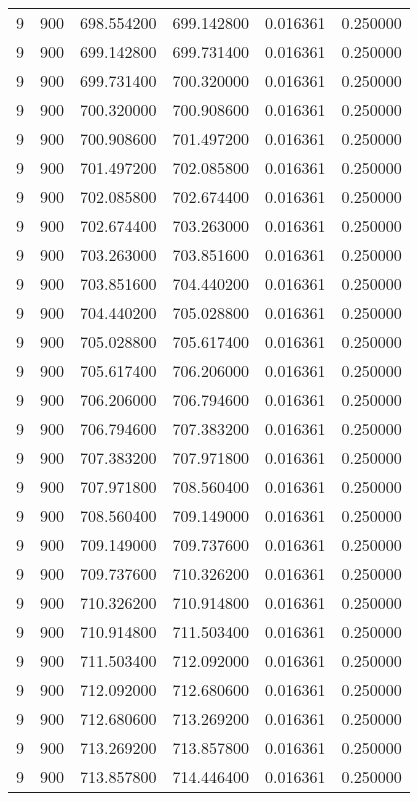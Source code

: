 \begin{longtable}{rrrrrr}
9 & 900 & 698.554200 & 699.142800 & 0.016361 & 0.250000 \\
9 & 900 & 699.142800 & 699.731400 & 0.016361 & 0.250000 \\
9 & 900 & 699.731400 & 700.320000 & 0.016361 & 0.250000 \\
9 & 900 & 700.320000 & 700.908600 & 0.016361 & 0.250000 \\
9 & 900 & 700.908600 & 701.497200 & 0.016361 & 0.250000 \\
9 & 900 & 701.497200 & 702.085800 & 0.016361 & 0.250000 \\
9 & 900 & 702.085800 & 702.674400 & 0.016361 & 0.250000 \\
9 & 900 & 702.674400 & 703.263000 & 0.016361 & 0.250000 \\
9 & 900 & 703.263000 & 703.851600 & 0.016361 & 0.250000 \\
9 & 900 & 703.851600 & 704.440200 & 0.016361 & 0.250000 \\
9 & 900 & 704.440200 & 705.028800 & 0.016361 & 0.250000 \\
9 & 900 & 705.028800 & 705.617400 & 0.016361 & 0.250000 \\
9 & 900 & 705.617400 & 706.206000 & 0.016361 & 0.250000 \\
9 & 900 & 706.206000 & 706.794600 & 0.016361 & 0.250000 \\
9 & 900 & 706.794600 & 707.383200 & 0.016361 & 0.250000 \\
9 & 900 & 707.383200 & 707.971800 & 0.016361 & 0.250000 \\
9 & 900 & 707.971800 & 708.560400 & 0.016361 & 0.250000 \\
9 & 900 & 708.560400 & 709.149000 & 0.016361 & 0.250000 \\
9 & 900 & 709.149000 & 709.737600 & 0.016361 & 0.250000 \\
9 & 900 & 709.737600 & 710.326200 & 0.016361 & 0.250000 \\
9 & 900 & 710.326200 & 710.914800 & 0.016361 & 0.250000 \\
9 & 900 & 710.914800 & 711.503400 & 0.016361 & 0.250000 \\
9 & 900 & 711.503400 & 712.092000 & 0.016361 & 0.250000 \\
9 & 900 & 712.092000 & 712.680600 & 0.016361 & 0.250000 \\
9 & 900 & 712.680600 & 713.269200 & 0.016361 & 0.250000 \\
9 & 900 & 713.269200 & 713.857800 & 0.016361 & 0.250000 \\
9 & 900 & 713.857800 & 714.446400 & 0.016361 & 0.250000 \\

\end{longtable}
